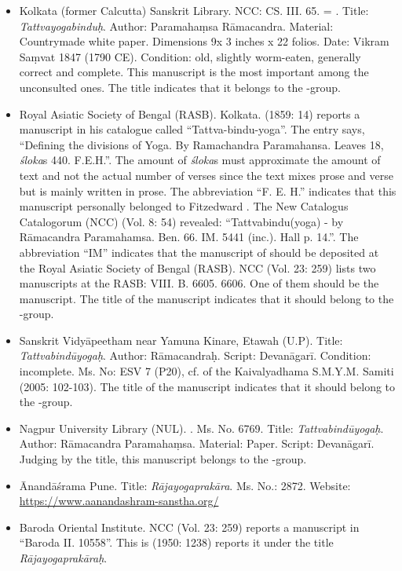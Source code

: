 \begin{itemize}
\item Kolkata (former Calcutta) Sanskrit Library. NCC: CS. III. 65. = . Title: \emph{Tattvayogabinduḥ}. Author: Paramahaṃsa Rāmacandra. Material: Countrymade white paper. Dimensions 9x 3 inches x 22 folios. Date: Vikram Saṃvat 1847 (1790 CE). Condition: old, slightly worm-eaten, generally correct and complete. This manuscript is the most important among the unconsulted ones. The title indicates that it belongs to the \alpha-group. 
\item Royal Asiatic Society of Bengal (RASB). Kolkata. \nocite{newcataloguscatalogorum8} \nocite{newcataloguscatalogorum23} \citeauthor{hall1859} (1859: 14) reports a manuscript  in his catalogue called ``Tattva-bindu-yoga''. The entry says, ``Defining the divisions of Yoga. By Ramachandra Paramahansa. Leaves 18, \textit{śloka}s 440. F.E.H.''. The amount of \textit{śloka}s must approximate the amount of text and not the actual number of verses since the text mixes prose and verse but is mainly written in prose. The abbreviation ``F. E. H.'' indicates that this manuscript personally belonged to Fitzedward \citeauthor{hall1859}. The New Catalogus Catalogorum (NCC) (Vol. 8: 54) revealed: ``Tattvabindu(yoga) - by Rāmacandra Paramahamsa. Ben. 66. IM. 5441 (inc.). Hall p. 14.''. The abbreviation ``IM'' indicates that the manuscript of \citeauthor{hall1859} should be deposited at the Royal Asiatic Society of Bengal (RASB). NCC (Vol. 23: 259) lists two manuscripts at the RASB: VIII. B. 6605. 6606. One of them should be the \citeauthor{hall1859} manuscript. The title of the manuscript indicates that it should belong to the \beta-group. 
\item Sanskrit Vidyāpeetham near Yamuna Kinare, Etawah (U.P). Title: \textit{Tattvabindūyogaḥ}. Author: Rāmacandraḥ. Script: Devanāgarī. Condition: incomplete. Ms. No: ESV 7 (P20), cf.  of the Kaivalyadhama S.M.Y.M. Samiti (2005: 102-103). The title of the manuscript indicates that it should belong to the \beta-group. 
\item  Nagpur University Library (NUL). . Ms. No. 6769. Title: \emph{Tattvabindūyogaḥ}. Author: Rāmacandra Paramahaṃsa. Material: Paper. Script: Devanāgarī. Judging by the title, this manuscript belongs to the \beta-group. 
\item Ānandāśrama Pune. Title: \emph{Rājayogaprakāra}. Ms. No.: 2872. Website: \url{https://www.aanandashram-sanstha.org/}
\item Baroda Oriental Institute. NCC (Vol. 23: 259) reports a manuscript in ``Baroda II. 10558''. This is  (1950: 1238) reports it under the title \textit{Rājayogaprakāraḥ}. %
\end{itemize}
  
